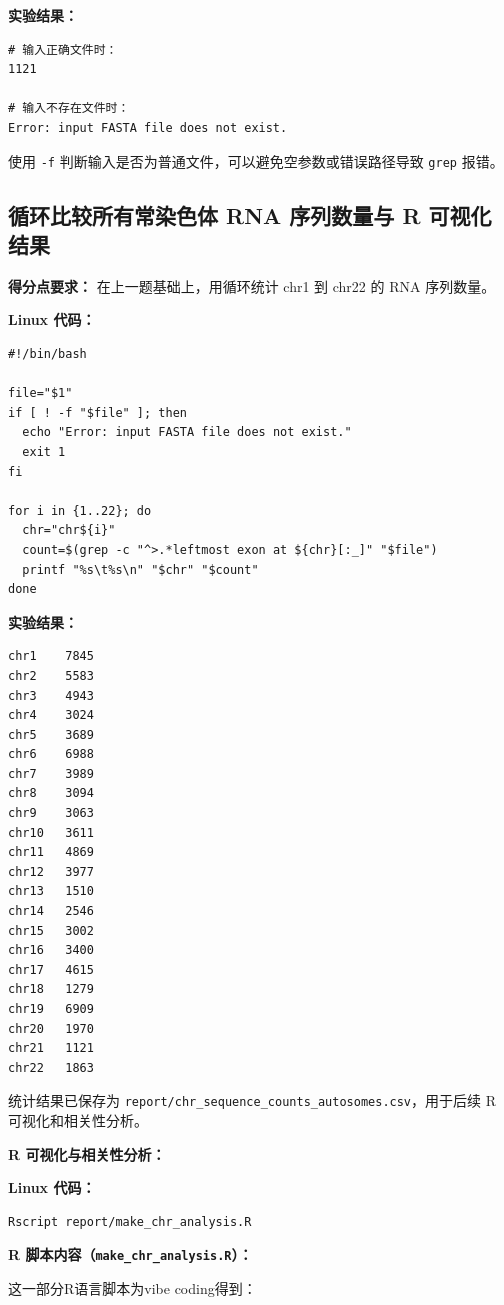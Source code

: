 \documentclass[12pt,a4paper,fontset=fandol]{ctexart}
\begin{document}
\noindent\textbf{实验结果：}
\begin{lstlisting}[style=resultcode]
# 输入正确文件时：
1121

# 输入不存在文件时：
Error: input FASTA file does not exist.
\end{lstlisting}

使用 \texttt{-f} 判断输入是否为普通文件，可以避免空参数或错误路径导致 \texttt{grep} 报错。

\subsection{循环比较所有常染色体 RNA 序列数量与 R 可视化结果}

\noindent\textbf{得分点要求：} 在上一题基础上，用循环统计 chr1 到 chr22 的 RNA 序列数量。

\noindent\textbf{Linux 代码：}
\begin{lstlisting}[style=linuxcode]
#!/bin/bash

file="$1"
if [ ! -f "$file" ]; then
  echo "Error: input FASTA file does not exist."
  exit 1
fi

for i in {1..22}; do
  chr="chr${i}"
  count=$(grep -c "^>.*leftmost exon at ${chr}[:_]" "$file")
  printf "%s\t%s\n" "$chr" "$count"
done
\end{lstlisting}

\noindent\textbf{实验结果：}
\begin{lstlisting}[style=resultcode]
chr1    7845
chr2    5583
chr3    4943
chr4    3024
chr5    3689
chr6    6988
chr7    3989
chr8    3094
chr9    3063
chr10   3611
chr11   4869
chr12   3977
chr13   1510
chr14   2546
chr15   3002
chr16   3400
chr17   4615
chr18   1279
chr19   6909
chr20   1970
chr21   1121
chr22   1863
\end{lstlisting}

统计结果已保存为 \texttt{report/chr\_sequence\_counts\_autosomes.csv}，用于后续 R 可视化和相关性分析。

\medskip
\noindent\textbf{R 可视化与相关性分析：}

\noindent\textbf{Linux 代码：}
\begin{lstlisting}[style=linuxcode]
Rscript report/make_chr_analysis.R
\end{lstlisting}

\noindent\textbf{R 脚本内容（\texttt{make\_chr\_analysis.R}）：}

这一部分R语言脚本为vibe coding得到：
\end{document}
